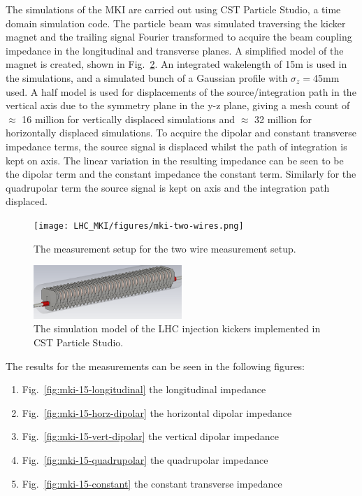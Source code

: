 The simulations of the MKI are carried out using CST Particle Studio, a time domain simulation code. The particle beam was simulated traversing the kicker magnet and the trailing signal Fourier transformed to acquire the beam coupling impedance in the longitudinal and transverse planes. A simplified model of the magnet is created, shown in Fig.~\ref{fig:mki-simulation-model}. An integrated wakelength of 15m is used in the simulations, and a simulated bunch of a Gaussian profile with $\sigma_{z}=$45mm used. A half model is used for displacements of the source/integration path in the vertical axis due to the symmetry plane in the y-z plane, giving a mesh count of $\approx$ 16 million for vertically displaced simulations and $\approx$ 32 million for horizontally displaced simulations. To acquire the dipolar and constant transverse impedance terms, the source signal is displaced whilst the path of integration is kept on axis. The linear variation in the resulting impedance can be seen to be the dipolar term and the constant impedance the constant term. Similarly for the quadrupolar term the source signal is kept on axis and the integration path displaced.

\begin{figure}
\begin{center}
\texttt{[image: LHC\_MKI/figures/mki-two-wires.png]}
\end{center}
\caption{The measurement setup for the two wire measurement setup.}
\label{fig:mki-meas-two-wire}
\end{figure}

\begin{figure}
\begin{center}
\includegraphics[width=0.5\textwidth]{LHC_MKI/figures/simulation-model-mki-15.png}
\end{center}
\caption{The simulation model of the LHC injection kickers implemented in CST Particle Studio.}
\label{fig:mki-simulation-model}
\end{figure}


The results for the measurements can be seen in the following figures:
\begin{enumerate}
\item{Fig.~\ref{fig:mki-15-longitudinal} the longitudinal impedance}
\item{Fig.~\ref{fig:mki-15-horz-dipolar} the horizontal dipolar impedance}
\item{Fig.~\ref{fig:mki-15-vert-dipolar} the vertical dipolar impedance}
\item{Fig.~\ref{fig:mki-15-quadrupolar} the quadrupolar impedance}
\item{Fig.~\ref{fig:mki-15-constant} the constant transverse impedance}
\end{enumerate}

